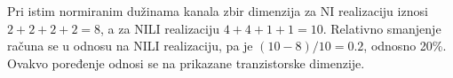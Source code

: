 Pri istim normiranim dužinama kanala zbir dimenzija za NI realizaciju iznosi $2+2+2+2=8$, a za NILI realizaciju $4+4+1+1=10$. Relativno smanjenje računa se u odnosu na NILI realizaciju, pa je $(10-8)/10=0.2$, odnosno 20\%. Ovakvo poređenje odnosi se na prikazane tranzistorske dimenzije.
